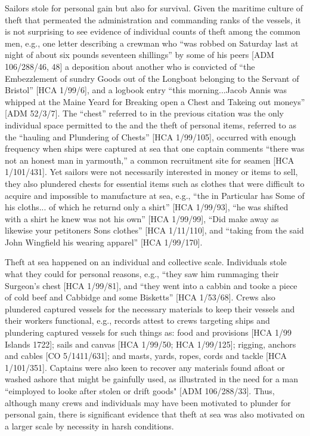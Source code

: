 Sailors stole for personal gain but also for survival. Given the maritime culture of theft that permeated the administration and commanding ranks of the vessels, it is not surprising to see evidence of individual counts of theft among the common men, e.g., one letter describing a crewman who “was robbed on Saturday last at night of about six pounds seventeen shillings” by some of his peers [ADM 106/288/46, 48] a deposition about another  who is convicted of “the Embezzlement of sundry Goods out of the Longboat belonging to the Servant of Bristol” [HCA 1/99/6], and a logbook entry “this morning...Jacob Annis was whipped at the Maine Yeard for Breaking open a Chest and Takeing out moneys” [ADM 52/3/7]. The “chest” referred to in the previous citation was the only individual space permitted to the  and the theft of personal items, referred to as the “hauling and Plundering of Chests” [HCA 1/99/105], occurred with enough frequency when ships were captured at sea that one captain comments “there was not an honest man in yarmouth,” a common recruitment site for seamen [HCA 1/101/431]. Yet sailors were not necessarily interested in money or items to sell, they also plundered chests for essential items such as clothes that were difficult to acquire and impossible to manufacture at sea, e.g., “the  in Particular has Some of his cloths... of which he returnd only a shirt” [HCA 1/99/93], “he was shifted with a shirt he knew was not his own” [HCA 1/99/99], “Did make away as likewise your petitoners Sons clothes” [HCA 1/11/110], and “taking from the said John Wingfield his wearing apparel” [HCA 1/99/170]. 

Theft at sea happened on an individual and collective scale. Individuals stole what they could for personal reasons, e.g., “they saw him rummaging their Surgeon’s chest [HCA 1/99/81], and “they went into a cabbin and tooke a piece of cold beef and Cabbidge and some Bisketts” [HCA 1/53/68]. Crews also plundered captured vessels for the necessary materials to keep their vessels and their workers functional, e.g., records attest to crews targeting ships and plundering captured vessels for such things as: food and provisions [HCA 1/99  Islands 1722]; sails and canvas [HCA 1/99/50; HCA 1/99/125]; rigging, anchors and cables [CO 5/1411/631]; and masts, yards, ropes, cords and tackle [HCA 1/101/351]. Captains were also keen to recover any materials found afloat or washed ashore that might be gainfully used, as illustrated in the need for a man “eimployed to looke after stolen or drift goods" [ADM 106/288/33]. Thus, although many crews and individuals may have been motivated to plunder for personal gain, there is significant evidence that theft at sea was also motivated on a larger scale by necessity in harsh conditions. 

